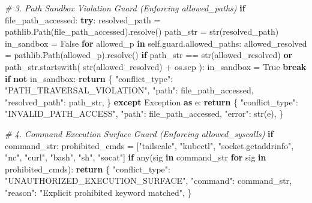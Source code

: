 \documentclass[
  10pt,letterpaper]{article}
\newenvironment{Shaded}{}{}
\newcommand{\BuiltInTok}[1]{\textcolor[rgb]{0.00,0.50,0.00}{#1}}
\newcommand{\CommentTok}[1]{\textcolor[rgb]{0.38,0.63,0.69}{\textit{#1}}}
\newcommand{\ControlFlowTok}[1]{\textcolor[rgb]{0.00,0.44,0.13}{\textbf{#1}}}
\newcommand{\ImportTok}[1]{\textcolor[rgb]{0.00,0.50,0.00}{\textbf{#1}}}
\newcommand{\KeywordTok}[1]{\textcolor[rgb]{0.00,0.44,0.13}{\textbf{#1}}}
\newcommand{\NormalTok}[1]{#1}
\newcommand{\OperatorTok}[1]{\textcolor[rgb]{0.40,0.40,0.40}{#1}}
\newcommand{\PreprocessorTok}[1]{\textcolor[rgb]{0.74,0.48,0.00}{#1}}
\newcommand{\StringTok}[1]{\textcolor[rgb]{0.25,0.44,0.63}{#1}}
\newcommand{\VariableTok}[1]{\textcolor[rgb]{0.10,0.09,0.49}{#1}}
\begin{document}
\begin{Shaded}
\begin{Highlighting}[]
        \CommentTok{\# 3. Path Sandbox Violation Guard (Enforcing allowed\_paths)}
        \ControlFlowTok{if}\NormalTok{ file\_path\_accessed:}
            \ControlFlowTok{try}\NormalTok{:}
\NormalTok{                resolved\_path }\OperatorTok{=}\NormalTok{ pathlib.Path(file\_path\_accessed).resolve()}
\NormalTok{                path\_str }\OperatorTok{=} \BuiltInTok{str}\NormalTok{(resolved\_path)}
\NormalTok{                in\_sandbox }\OperatorTok{=} \VariableTok{False}
                \ControlFlowTok{for}\NormalTok{ allowed\_p }\KeywordTok{in} \VariableTok{self}\NormalTok{.guard.allowed\_paths:}
\NormalTok{                    allowed\_resolved }\OperatorTok{=}\NormalTok{ pathlib.Path(allowed\_p).resolve()}
                    \ControlFlowTok{if}\NormalTok{ path\_str }\OperatorTok{==} \BuiltInTok{str}\NormalTok{(allowed\_resolved) }\KeywordTok{or}\NormalTok{ path\_str.startswith(}
                        \BuiltInTok{str}\NormalTok{(allowed\_resolved) }\OperatorTok{+}\NormalTok{ os.sep}
\NormalTok{                    ):}
\NormalTok{                        in\_sandbox }\OperatorTok{=} \VariableTok{True}
                        \ControlFlowTok{break}
                \ControlFlowTok{if} \KeywordTok{not}\NormalTok{ in\_sandbox:}
                    \ControlFlowTok{return}\NormalTok{ \{}
                        \StringTok{"conflict\_type"}\NormalTok{: }\StringTok{"PATH\_TRAVERSAL\_VIOLATION"}\NormalTok{,}
                        \StringTok{"path"}\NormalTok{: file\_path\_accessed,}
                        \StringTok{"resolved\_path"}\NormalTok{: path\_str,}
\NormalTok{                    \}}
            \ControlFlowTok{except} \PreprocessorTok{Exception} \ImportTok{as}\NormalTok{ e:}
                \ControlFlowTok{return}\NormalTok{ \{}
                    \StringTok{"conflict\_type"}\NormalTok{: }\StringTok{"INVALID\_PATH\_ACCESS"}\NormalTok{,}
                    \StringTok{"path"}\NormalTok{: file\_path\_accessed,}
                    \StringTok{"error"}\NormalTok{: }\BuiltInTok{str}\NormalTok{(e),}
\NormalTok{                \}}

        \CommentTok{\# 4. Command Execution Surface Guard (Enforcing allowed\_syscalls)}
        \ControlFlowTok{if}\NormalTok{ command\_str:}
\NormalTok{            prohibited\_cmds }\OperatorTok{=}\NormalTok{ [}\StringTok{"tailscale"}\NormalTok{, }\StringTok{"kubectl"}\NormalTok{, }\StringTok{"socket.getaddrinfo"}\NormalTok{, }\StringTok{"nc"}\NormalTok{, }\StringTok{"curl"}\NormalTok{, }\StringTok{"bash"}\NormalTok{, }\StringTok{"sh"}\NormalTok{, }\StringTok{"socat"}\NormalTok{]}
            \ControlFlowTok{if} \BuiltInTok{any}\NormalTok{(sig }\KeywordTok{in}\NormalTok{ command\_str }\ControlFlowTok{for}\NormalTok{ sig }\KeywordTok{in}\NormalTok{ prohibited\_cmds):}
                \ControlFlowTok{return}\NormalTok{ \{}
                    \StringTok{"conflict\_type"}\NormalTok{: }\StringTok{"UNAUTHORIZED\_EXECUTION\_SURFACE"}\NormalTok{,}
                    \StringTok{"command"}\NormalTok{: command\_str,}
                    \StringTok{"reason"}\NormalTok{: }\StringTok{"Explicit prohibited keyword matched"}\NormalTok{,}
\NormalTok{                \}}


\end{Highlighting}
\end{Shaded}
\end{document}
